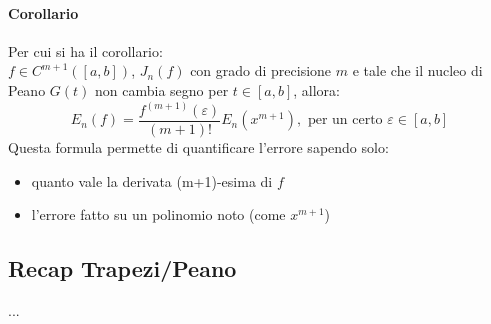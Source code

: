 \documentclass[12pt,a4paper,]{report}
\begin{document}
\paragraph{Corollario}
Per cui si ha il corollario:\\
$f \in C^{m+1}([a, b])$, $J_n(f)$ con grado di precisione $m$ e tale che il nucleo di Peano $G(t)$ non cambia segno per $t \in [a, b]$, allora:
\[
E_n(f) = \frac{f^{(m+1)}(\varepsilon)}{(m + 1)!} E_n(x^{m+1}), \text{ per un certo } \varepsilon \in [a, b]
\]
Questa formula permette di quantificare l'errore sapendo solo:
\begin{itemize}
    \item quanto vale la derivata (m+1)-esima di $f$
    \item l'errore fatto su un polinomio noto (come $x^{m+1}$)
\end{itemize}


\begin{lezione}
    [Lezione 17 29/04]
\end{lezione}

\subsection{Recap Trapezi/Peano}
...
\end{document}
